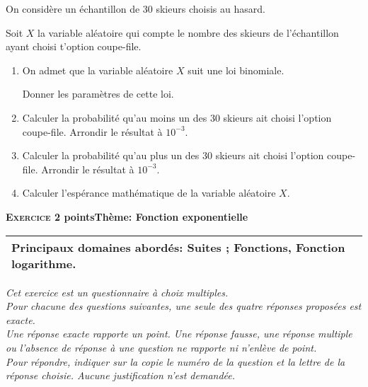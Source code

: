 \documentclass[11pt,a4paper,french]{article}
\begin{document}
On considère un échantillon de $30$ skieurs choisis au hasard.

Soit $X$ la variable aléatoire qui compte le nombre des skieurs de l'échantillon ayant
choisi t'option coupe-file.

\medskip

\begin{enumerate}
\item On admet que la variable aléatoire $X$ suit une loi binomiale. 

Donner les paramètres de cette loi.
\item Calculer la probabilité qu'au moins un des $30$ skieurs ait choisi l'option coupe-file. Arrondir le résultat à $10^{-3}$.
\item Calculer la probabilité qu'au plus un des $30$ skieurs ait choisi l'option coupe-file. Arrondir le résultat à $10^{-3}$.
\item Calculer l'espérance mathématique de la variable aléatoire $X$.
\end{enumerate}

\bigskip

\textbf{\textsc{Exercice 2}  points\hfill Thème: Fonction exponentielle }

\medskip

\begin{tabularx}{\linewidth}{|X|}\hline
\textbf{Principaux domaines abordés:} Suites ; Fonctions, Fonction logarithme.\\ \hline
\end{tabularx}

\medskip

\emph{Cet exercice est un questionnaire à choix multiples.\\
Pour chacune des questions suivantes, une seule des quatre réponses proposées
est exacte.\\
Une réponse exacte rapporte un point. Une réponse fausse, une réponse multiple ou
l'absence de réponse à une question ne rapporte ni n'enlève de point.\\
Pour répondre, indiquer sur la copie le numéro de la question et la lettre de la réponse choisie. Aucune justification n'est demandée.}
\end{document}
